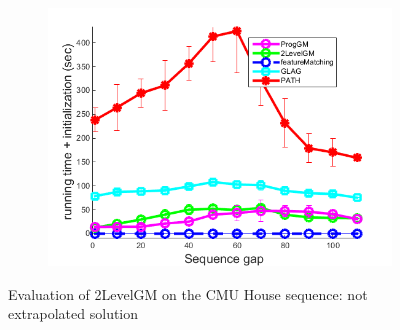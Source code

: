 \begin{figure}[h]
\begin{subfigure}[b]{0.33\textwidth}
		\end{subfigure}
		\begin{subfigure}[b]{0.32\textwidth}
			\centering
			\includegraphics[scale=0.25]{"chapter3/fig/HouseSeq2/anchor_descr/using_cpd_afftrafo/solution2/performance/time_summary"}
		\end{subfigure} 	
	\caption[Evaluation of 2LevelGM on the CMU House sequence]{Evaluation of 2LevelGM on the CMU House sequence: not extrapolated solution} \label{fig:House_sol}
\end{figure}

